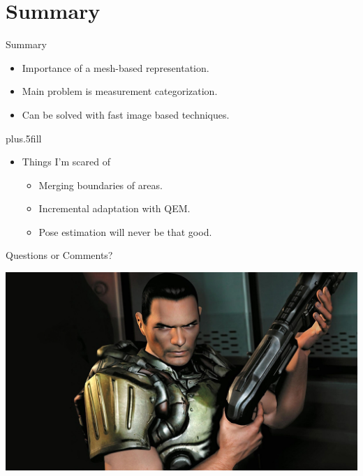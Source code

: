 \documentclass{beamer}
\begin{document}
\section*{Summary}

\begin{frame}{Summary}

  \begin{itemize}
  \item Importance of a mesh-based representation. 
  \item Main problem is measurement categorization.
  \item Can be solved with fast image based techniques.
  \end{itemize}
  
  \vskip0pt plus.5fill
  \begin{itemize}
  \item
    Things I'm scared of
    \begin{itemize}
    \item Merging boundaries of areas.
    \item Incremental adaptation with QEM.
    \item Pose estimation will never be that good.
    \end{itemize}
  \end{itemize}
\end{frame}

\begin{frame}
Questions or Comments?
  \begin{center}
  \includegraphics[width=\textwidth]{Doom3.jpg} 
  \end{center}
\end{frame}
\end{document}

